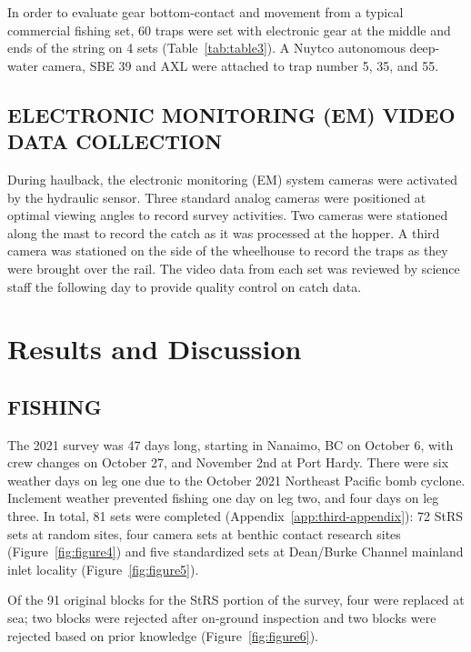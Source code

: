 \documentclass[12pt]{article}\usepackage[]{graphicx}\usepackage[]{color}
\begin{document}
In order to evaluate gear bottom-contact and movement from a typical commercial fishing set, 60 traps were set with electronic gear at the middle and ends of the string on 4 sets (Table~\ref{tab:table3}). A Nuytco autonomous deep-water camera, SBE 39 and AXL were attached to trap number 5, 35, and 55.

\hypertarget{electronic-monitoring-em-video-data-collection}{%
\subsection{ELECTRONIC MONITORING (EM) VIDEO DATA COLLECTION}\label{electronic-monitoring-em-video-data-collection}}

During haulback, the electronic monitoring (EM) system cameras were activated by the hydraulic sensor. Three standard analog cameras were positioned at optimal viewing angles to record survey activities. Two cameras were stationed along the mast to record the catch as it was processed at the hopper. A third camera was stationed on the side of the wheelhouse to record the traps as they were brought over the rail. The video data from each set was reviewed by science staff the following day to provide quality control on catch data.

\hypertarget{results-and-discussion}{%
\section{Results and Discussion}\label{results-and-discussion}}

\hypertarget{fishing}{%
\subsection{FISHING}\label{fishing}}

The 2021 survey was 47 days long, starting in Nanaimo, BC on October 6, with crew changes on October 27, and November 2nd at Port Hardy. There were six weather days on leg one due to the October 2021 Northeast Pacific bomb cyclone. Inclement weather prevented fishing one day on leg two, and four days on leg three. In total, 81 sets were completed (Appendix~\ref{app:third-appendix}): 72 StRS sets at random sites, four camera sets at benthic contact research sites (Figure~\ref{fig:figure4}) and five standardized sets at Dean/Burke Channel mainland inlet locality (Figure~\ref{fig:figure5}).

Of the 91 original blocks for the StRS portion of the survey, four were replaced at sea; two blocks were rejected after on-ground inspection and two blocks were rejected based on prior knowledge (Figure~\ref{fig:figure6}).
\end{document}
